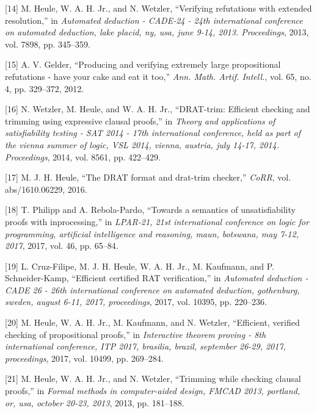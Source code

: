 \documentclass[
]{report}
\begin{document}
\leavevmode\hypertarget{ref-DBLP:confux2fcadeux2fHeuleHW13}{}%
{[}14{]} M. Heule, W. A. H. Jr., and N. Wetzler, ``Verifying refutations
with extended resolution,'' in \emph{Automated deduction - CADE-24 -
24th international conference on automated deduction, lake placid, ny,
usa, june 9-14, 2013. Proceedings}, 2013, vol. 7898, pp. 345--359.

\leavevmode\hypertarget{ref-DBLP:journalsux2famaiux2fGelder12}{}%
{[}15{]} A. V. Gelder, ``Producing and verifying extremely large
propositional refutations - have your cake and eat it too,'' \emph{Ann.
Math. Artif. Intell.}, vol. 65, no. 4, pp. 329--372, 2012.

\leavevmode\hypertarget{ref-DBLP:confux2fsatux2fWetzlerHH14}{}%
{[}16{]} N. Wetzler, M. Heule, and W. A. H. Jr., ``DRAT-trim: Efficient
checking and trimming using expressive clausal proofs,'' in \emph{Theory
and applications of satisfiability testing - SAT 2014 - 17th
international conference, held as part of the vienna summer of logic,
VSL 2014, vienna, austria, july 14-17, 2014. Proceedings}, 2014, vol.
8561, pp. 422--429.

\leavevmode\hypertarget{ref-DBLP:journalsux2fcorrux2fHeule16}{}%
{[}17{]} M. J. H. Heule, ``The DRAT format and drat-trim checker,''
\emph{CoRR}, vol. abs/1610.06229, 2016.

\leavevmode\hypertarget{ref-DBLP:confux2flparux2fPhilippR17}{}%
{[}18{]} T. Philipp and A. Rebola-Pardo, ``Towards a semantics of
unsatisfiability proofs with inprocessing,'' in \emph{LPAR-21, 21st
international conference on logic for programming, artificial
intelligence and reasoning, maun, botswana, may 7-12, 2017}, 2017, vol.
46, pp. 65--84.

\leavevmode\hypertarget{ref-DBLP:confux2fcadeux2fCruz-FilipeHHKS17}{}%
{[}19{]} L. Cruz-Filipe, M. J. H. Heule, W. A. H. Jr., M. Kaufmann, and
P. Schneider-Kamp, ``Efficient certified RAT verification,'' in
\emph{Automated deduction - CADE 26 - 26th international conference on
automated deduction, gothenburg, sweden, august 6-11, 2017,
proceedings}, 2017, vol. 10395, pp. 220--236.

\leavevmode\hypertarget{ref-DBLP:confux2fitpux2fHeuleHKW17}{}%
{[}20{]} M. Heule, W. A. H. Jr., M. Kaufmann, and N. Wetzler,
``Efficient, verified checking of propositional proofs,'' in
\emph{Interactive theorem proving - 8th international conference, ITP
2017, brasilia, brazil, september 26-29, 2017, proceedings}, 2017, vol.
10499, pp. 269--284.

\leavevmode\hypertarget{ref-DBLP:confux2ffmcadux2fHeuleHW13}{}%
{[}21{]} M. Heule, W. A. H. Jr., and N. Wetzler, ``Trimming while
checking clausal proofs,'' in \emph{Formal methods in computer-aided
design, FMCAD 2013, portland, or, usa, october 20-23, 2013}, 2013, pp.
181--188.
\end{document}
